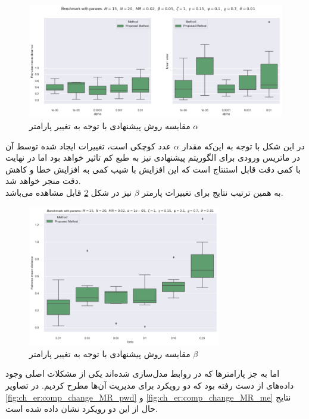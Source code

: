 \begin{figure}[!ht]
	\centering
	\includegraphics[width=\textwidth]{img/chaps/er/comp_change_alpha}
	\caption{‌مقایسه روش پیشنهادی با توجه به تغییر پارامتر $\alpha$}
	\label{fig:ch_er:comp_change_alpha}
\end{figure}
\noindent
در این شکل با توجه به این‌که مقدار $\alpha$ عدد کوچکی است، تغییرات ایجاد شده توسط آن در ماتریس ورودی برای الگوریتم پیشنهادی نیز به طبع کم تاثیر خواهد بود اما در نهایت با کمی دقت قابل استنتاج است که این افزایش با شیب کمی به افزایش خطا و کاهش دقت منجر خواهد شد.\\
به همین ترتیب نتایج برای تغییرات پارمتر $\beta$ نیز در شکل \ref{fig:ch_er:comp_change_beta} قابل مشاهده می‌باشد.

\begin{figure}[!ht]
	\centering
	\includegraphics[width=0.75\textwidth]{img/chaps/er/comp_change_beta}
	\caption{‌مقایسه روش پیشنهادی با توجه به تغییر پارامتر $\beta$}
	\label{fig:ch_er:comp_change_beta}
\end{figure}
\noindent
اما به جز پارامترها که در روابط مد‌ل‌سازی شده‌اند یکی از مشکلات اصلی وجود داده‌های از دست رفته بود که دو رویکرد برای مدیریت آن‌ها مطرح کردیم. در تصاویر \ref{fig:ch_er:comp_change_MR_pwd} و \ref{fig:ch_er:comp_change_MR_me} نتایج حال از این دو رویکرد نشان داده شده است.

